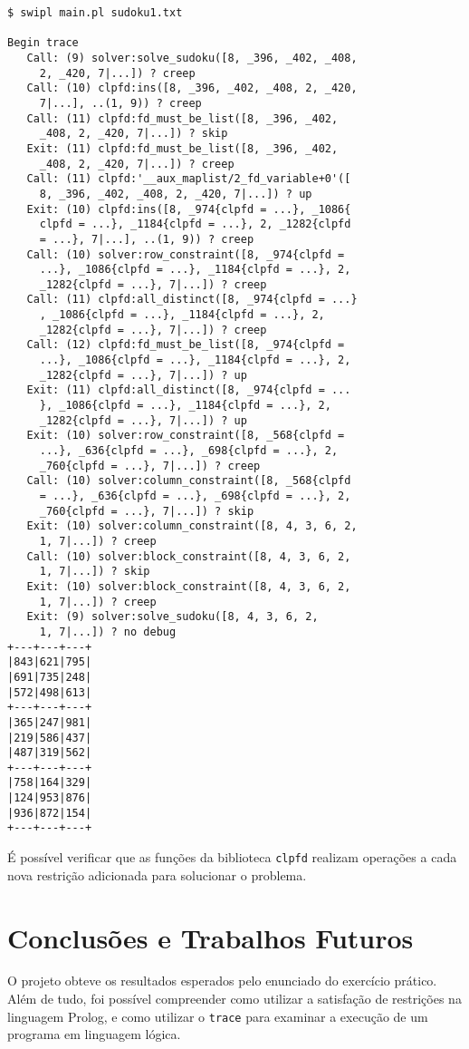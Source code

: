 \documentclass[journal,transmag]{IEEEtran}
\begin{document}
\begin{footnotesize}\begin{verbatim}
$ swipl main.pl sudoku1.txt

Begin trace
   Call: (9) solver:solve_sudoku([8, _396, _402, _408,
     2, _420, 7|...]) ? creep
   Call: (10) clpfd:ins([8, _396, _402, _408, 2, _420,
     7|...], ..(1, 9)) ? creep
   Call: (11) clpfd:fd_must_be_list([8, _396, _402,
     _408, 2, _420, 7|...]) ? skip
   Exit: (11) clpfd:fd_must_be_list([8, _396, _402,
     _408, 2, _420, 7|...]) ? creep
   Call: (11) clpfd:'__aux_maplist/2_fd_variable+0'([
     8, _396, _402, _408, 2, _420, 7|...]) ? up
   Exit: (10) clpfd:ins([8, _974{clpfd = ...}, _1086{
     clpfd = ...}, _1184{clpfd = ...}, 2, _1282{clpfd
     = ...}, 7|...], ..(1, 9)) ? creep
   Call: (10) solver:row_constraint([8, _974{clpfd =
     ...}, _1086{clpfd = ...}, _1184{clpfd = ...}, 2,
     _1282{clpfd = ...}, 7|...]) ? creep
   Call: (11) clpfd:all_distinct([8, _974{clpfd = ...}
     , _1086{clpfd = ...}, _1184{clpfd = ...}, 2,
     _1282{clpfd = ...}, 7|...]) ? creep
   Call: (12) clpfd:fd_must_be_list([8, _974{clpfd =
     ...}, _1086{clpfd = ...}, _1184{clpfd = ...}, 2,
     _1282{clpfd = ...}, 7|...]) ? up
   Exit: (11) clpfd:all_distinct([8, _974{clpfd = ...
     }, _1086{clpfd = ...}, _1184{clpfd = ...}, 2,
     _1282{clpfd = ...}, 7|...]) ? up
   Exit: (10) solver:row_constraint([8, _568{clpfd =
     ...}, _636{clpfd = ...}, _698{clpfd = ...}, 2,
     _760{clpfd = ...}, 7|...]) ? creep
   Call: (10) solver:column_constraint([8, _568{clpfd
     = ...}, _636{clpfd = ...}, _698{clpfd = ...}, 2,
     _760{clpfd = ...}, 7|...]) ? skip
   Exit: (10) solver:column_constraint([8, 4, 3, 6, 2,
     1, 7|...]) ? creep
   Call: (10) solver:block_constraint([8, 4, 3, 6, 2,
     1, 7|...]) ? skip
   Exit: (10) solver:block_constraint([8, 4, 3, 6, 2,
     1, 7|...]) ? creep
   Exit: (9) solver:solve_sudoku([8, 4, 3, 6, 2,
     1, 7|...]) ? no debug
+---+---+---+
|843|621|795|
|691|735|248|
|572|498|613|
+---+---+---+
|365|247|981|
|219|586|437|
|487|319|562|
+---+---+---+
|758|164|329|
|124|953|876|
|936|872|154|
+---+---+---+
\end{verbatim}\end{footnotesize}

É possível verificar que as funções da biblioteca \texttt{clpfd} realizam
operações a cada nova restrição adicionada para solucionar o problema.


\section{Conclusões e Trabalhos Futuros}
O projeto obteve os resultados esperados pelo enunciado do exercício prático.
Além de tudo, foi possível compreender como utilizar a satisfação de restrições
na linguagem Prolog, e como utilizar o \texttt{trace} para examinar a execução
de um programa em linguagem lógica.
\end{document}

